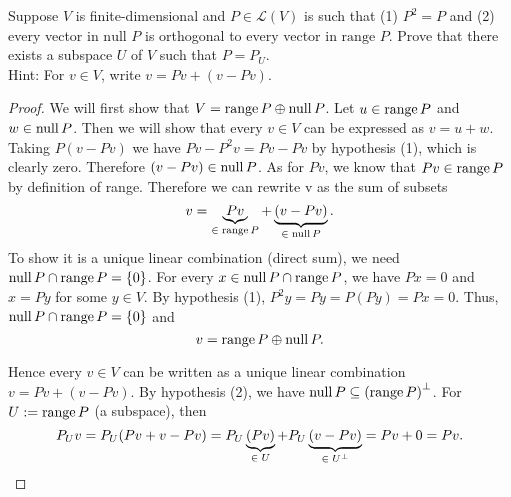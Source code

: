 Suppose $V$ is finite-dimensional and $P \in \mathcal{L}(V)$ is such that (1) $P^2 = P$ and (2) every vector in $\text{null } P$ is orthogonal to every vector in $\text{range }P$. Prove that there exists a subspace $U$ of $V$ such that $P = P_U$.\\
    Hint:  For $v \in V$, write $v = Pv + (v-Pv)$.

    \vspace{0.5in}

\begin{proof}  We will first show that $V = \operatorname{range}{P} \oplus \operatorname{null} P$. Let $u \in \operatorname{range}{P}$ and $w \in \operatorname{null} P$. Then we will show that every $v \in V$ can be expressed as $v = u + w$. Taking $P(v - Pv)$ we have $Pv - P^2v = Pv - Pv$ by hypothesis (1), which is clearly zero. Therefore $(v - Pv) \in \operatorname{null} P$. As for $Pv$, we know that $Pv \in \operatorname{range}{P}$ by definition of range. Therefore we can rewrite v as the sum of subsets
$$v = \underbrace{Pv}_{\in \; \operatorname{range}{P}} + \underbrace{(v-Pv)}_{\in \; \operatorname{null} P}.$$
To show it is a unique linear combination (direct sum), we need $\operatorname{null} P \cap \operatorname{range}{P} = \left\{{0}\right\}$. For every $x \in \operatorname{null} P \cap \operatorname{range}{P}$, we have $Px = 0$ and $x = Py$ for some $y \in V$. By hypothesis (1), $P^2y = Py = P(Py) = Px = 0$. Thus, $\operatorname{null} P \cap \operatorname{range}{P} = \left\{{0}\right\}$ and
$$v = \operatorname{range}{P} \oplus \operatorname{null} P.$$

Hence every $v \in V$ can be written as a unique linear combination $v = Pv + (v - Pv)$. By hypothesis (2), we have $\operatorname{null} P \subseteq \left( {\operatorname{range}{P}} \right)^{\perp}$. For $U := \operatorname{range}{P}$ (a subspace), then
$$P_Uv = P_U(Pv + v - Pv) = P_U\underbrace{(Pv)}_{\in \; U} + P_U\underbrace{(v-Pv)}_{\in \; {U}^{\perp}} = Pv + 0 = Pv.$$ 

\end{proof}